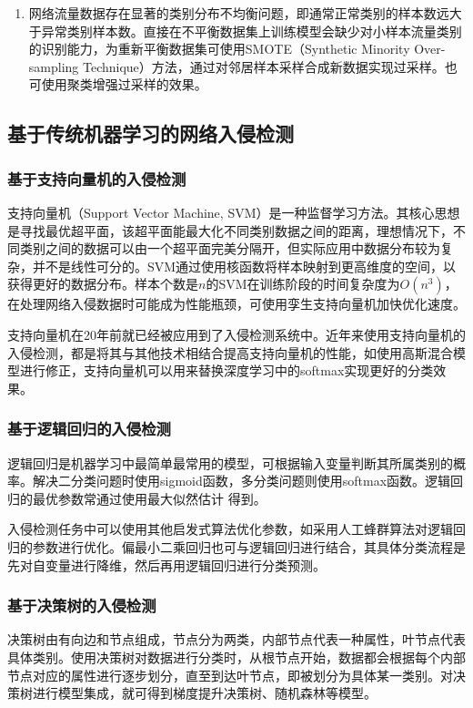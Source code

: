 \begin{enumerate}
    \item 网络流量数据存在显著的类别分布不均衡问题，即通常正常类别的样本数远大于异常类别样本数。直接在不平衡数据集上训练模型会缺少对小样本流量类别的识别能力，为重新平衡数据集可使用SMOTE（Synthetic Minority Over-sampling Technique）方法，通过对邻居样本采样合成新数据实现过采样\cite{PMID:34138657,10.7717/peerj-cs.721}。也可使用聚类增强过采样的效果\cite{XAXB202306010}。
    
\end{enumerate}
\subsection{基于传统机器学习的网络入侵检测}
\subsubsection{基于支持向量机的入侵检测}
支持向量机（Support Vector Machine, SVM）是一种监督学习方法。其核心思想是寻找最优超平面，该超平面能最大化不同类别数据之间的距离，理想情况下，不同类别之间的数据可以由一个超平面完美分隔开，但实际应用中数据分布较为复杂，并不是线性可分的。SVM通过使用核函数将样本映射到更高维度的空间，以获得更好的数据分布。样本个数是$n$的SVM在训练阶段的时间复杂度为$O(n^3)$，在处理网络入侵数据时可能成为性能瓶颈，可使用孪生支持向量机加快优化速度\cite{10.1109/ACCESS.2023.3251354}。

支持向量机在20年前就已经被应用到了入侵检测系统中\cite{10.1007/978-3-540-45235-5_73}。近年来使用支持向量机的入侵检测，都是将其与其他技术相结合提高支持向量机的性能，如使用高斯混合模型进行修正\cite{10.3390/electronics12040930}，支持向量机可以用来替换深度学习中的softmax实现更好的分类效果\cite{PMID:37960661}。
\subsubsection{基于逻辑回归的入侵检测}
逻辑回归是机器学习中最简单最常用的模型，可根据输入变量判断其所属类别的概率。解决二分类问题时使用sigmoid函数，多分类问题则使用softmax函数。逻辑回归的最优参数常通过使用最大似然估计 得到。

入侵检测任务中可以使用其他启发式算法优化参数，如采用人工蜂群算法对逻辑回归的参数进行优化\cite{10.1016/j.csi.2023.103808}。偏最小二乘回归也可与逻辑回归进行结合，其具体分类流程是先对自变量进行降维，然后再用逻辑回归进行分类预测\cite{10.1007/978-981-33-4922-3_10}。
\subsubsection{基于决策树的入侵检测}
决策树由有向边和节点组成，节点分为两类，内部节点代表一种属性，叶节点代表具体类别。使用决策树对数据进行分类时，从根节点开始，数据都会根据每个内部节点对应的属性进行逐步划分，直至到达叶节点，即被划分为具体某一类别。对决策树进行模型集成，就可得到梯度提升决策树、随机森林等模型。

